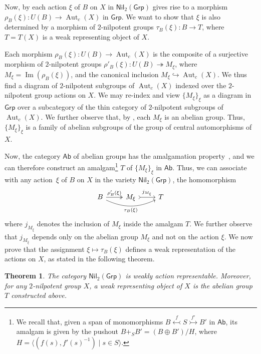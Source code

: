 \documentclass[reqno,hidelinks,a4paper]{amsart}
\theoremstyle{plain}
\newtheorem{theorem}[subsection]{Theorem}
\theoremstyle{definition}
\theoremstyle{remark}
\numberwithin{equation}{section}
\DeclareMathOperator{\Aut}{Aut}
\DeclareMathOperator{\Imm}{Im}
\newcommand{\Grp}{\ensuremath{\mathsf{Grp}}}
\newcommand{\Ab}{\ensuremath{\mathsf{Ab}}}
\newcommand{\Nil}{\ensuremath{\mathsf{Nil}}}
\begin{document}
Now, by  each action \(\xi\) of \(B\) on \(X\) in \(\Nil_2(\Grp)\) gives rise to a morphism \(\rho_B(\xi)\colon U(B)\to \Aut_c(X)\) in \(\Grp\). We want to show that \(\xi\) is also determined by a morphism of \(2\)-nilpotent groups \(\tau_B(\xi)\colon B\to T\), where \(T=T(X)\) is a weak representing object of \(X\).

Each morphism \(\rho_B(\xi)\colon U(B)\to \Aut_c(X)\) is the composite of a surjective morphism of \(2\)-nilpotent groups \(\rho'_B(\xi)\colon U(B)\twoheadrightarrow M_\xi\), where \(M_\xi=\Imm(\rho_B(\xi))\), and the canonical inclusion \(M_\xi \hookrightarrow \Aut_c(X)\). We thus find a diagram of \(2\)-nilpotent subgroups of \(\Aut_c(X)\) indexed over the \(2\)-nilpotent group actions on \(X\). We may re-index and view \(\{M_\xi\}_\xi\) as a diagram in \(\Grp\) over a subcategory of the thin category of \(2\)-nilpotent subgroups of \(\Aut_c(X)\). We further observe that, by , each \(M_\xi\) is an abelian group. Thus, \(\{M_\xi\}_\xi\) is a family of abelian subgroups of the group of central automorphisms of~\(X\).

Now, the category \(\Ab\) of abelian groups has the amalgamation property~\cite{kiss}, and we can therefore construct an amalgam\footnote{We recall that, given a span of monomorphisms \(B \mathrel{\stackrel{f}{\leftarrowtail}} S \mathrel{\stackrel{f'}{\rightarrowtail}} B'\) in \(\Ab\), its amalgam is given by the pushout
    \(B +_S B'=(B \oplus B') / H\), where \(H=\langle (f(s),f'(s)^{-1}) \mid s \in S \rangle\).} \(T\) of \(\{M_\xi\}_\xi\) in \(\Ab\). Thus, we can associate with any action~\(\xi\) of \(B\) on \(X\) in the variety \(\Nil_2(\Grp)\), the homomorphism
\begin{equation*}
    \begin{tikzcd}
        B \arrow[r, two heads, "\rho'_B(\xi)"]
        & M_\xi \arrow[r, tail, "j_{M_\xi}"]
        & T
        \arrow[from=1-1, to=1-3, bend right=25, "\tau_B(\xi)"']
    \end{tikzcd}
\end{equation*}
where \(j_{M_\xi}\) denotes the inclusion of \(M_\xi\) inside the amalgam \(T\). We further observe that \(j_{M_\xi}\) depends only on the abelian group \(M_\xi\) and not on the action \(\xi\). We now prove that the assignment \(\xi \mapsto \tau_B(\xi)\) defines a weak representation of the actions on \(X\), as stated in the following theorem.

\begin{theorem}\label{thm_wra}
    The category \(\Nil_2(\Grp)\) is weakly action representable. Moreover, for any \(2\)-nilpotent group \(X\), a weak representing object of \(X\) is the abelian group~\(T\) constructed above.
\end{theorem}
\end{document}
